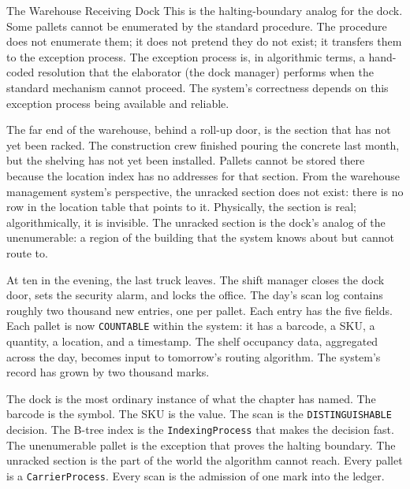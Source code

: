 \begin{coda}{The Warehouse Receiving Dock}
This is the halting-boundary analog for the dock. Some pallets cannot be
enumerated by the standard procedure. The procedure does not enumerate
them; it does not pretend they do not exist; it transfers them to the
exception process. The exception process is, in algorithmic terms, a
hand-coded resolution that the elaborator (the dock manager) performs
when the standard mechanism cannot proceed. The system's correctness
depends on this exception process being available and reliable.

The far end of the warehouse, behind a roll-up door, is the section
that has not yet been racked. The construction crew finished pouring
the concrete last month, but the shelving has not yet been installed.
Pallets cannot be stored there because the location index has no
addresses for that section. From the warehouse management system's
perspective, the unracked section does not exist: there is no row in
the location table that points to it. Physically, the section is real;
algorithmically, it is invisible. The unracked section is the dock's
analog of the unenumerable: a region of the building that the system
knows about but cannot route to.

At ten in the evening, the last truck leaves. The shift manager closes
the dock door, sets the security alarm, and locks the office. The day's
scan log contains roughly two thousand new entries, one per pallet. Each
entry has the five fields. Each pallet is now \texttt{COUNTABLE} within
the system: it has a barcode, a SKU, a quantity, a location, and a
timestamp. The shelf occupancy data, aggregated across the day, becomes
input to tomorrow's routing algorithm. The system's record has grown by
two thousand marks.

The dock is the most ordinary instance of what the chapter has named.
The barcode is the symbol. The SKU is the value. The scan is the
\texttt{DISTINGUISHABLE} decision. The B-tree index is the
\texttt{IndexingProcess} that makes the decision fast. The unenumerable
pallet is the exception that proves the halting boundary. The unracked
section is the part of the world the algorithm cannot reach. Every
pallet is a \texttt{CarrierProcess}. Every scan is the admission of one
mark into the ledger.

\end{coda}
